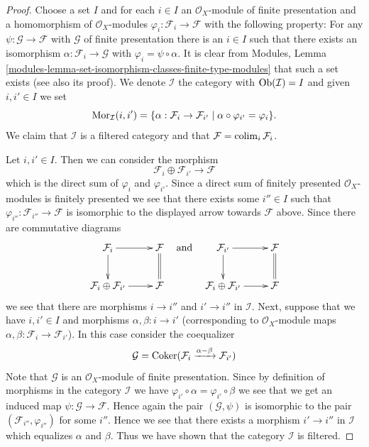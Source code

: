 \begin{proof}
Choose a set $I$ and for each $i \in I$ an $\mathcal{O}_X$-module
of finite presentation and a homomorphism of $\mathcal{O}_X$-modules
$\varphi_i : \mathcal{F}_i \to \mathcal{F}$ with the following
property: For any $\psi : \mathcal{G} \to \mathcal{F}$ with $\mathcal{G}$
of finite presentation there is an $i \in I$ such that there exists
an isomorphism $\alpha : \mathcal{F}_i \to \mathcal{G}$ with
$\varphi_i = \psi \circ \alpha$. It is clear from
Modules, Lemma \ref{modules-lemma-set-isomorphism-classes-finite-type-modules}
that such a set exists (see also its proof).
We denote $\mathcal{I}$ the category
with $\mathop{\mathrm{Ob}}\nolimits(\mathcal{I}) = I$ and given $i, i' \in I$
we set
$$
\mathop{\mathrm{Mor}}\nolimits_\mathcal{I}(i, i') =
\{\alpha : \mathcal{F}_i \to \mathcal{F}_{i'} \mid
\alpha \circ \varphi_{i'} = \varphi_i
\}.
$$
We claim that $\mathcal{I}$ is a filtered category and that
$\mathcal{F} = \mathop{\mathrm{colim}}\nolimits_i \mathcal{F}_i$.

\medskip\noindent
Let $i, i' \in I$. Then we can consider the morphism
$$
\mathcal{F}_i \oplus \mathcal{F}_{i'} \longrightarrow \mathcal{F}
$$
which is the direct sum of $\varphi_i$ and $\varphi_{i'}$.
Since a direct sum of finitely presented $\mathcal{O}_X$-modules
is finitely presented we see that there exists some $i'' \in I$
such that $\varphi_{i''} : \mathcal{F}_{i''} \to \mathcal{F}$
is isomorphic to the displayed arrow towards $\mathcal{F}$ above.
Since there are commutative diagrams
$$
\xymatrix{
\mathcal{F}_i \ar[r] \ar[d] & \mathcal{F} \ar@{=}[d] \\
\mathcal{F}_i \oplus \mathcal{F}_{i'} \ar[r] & \mathcal{F}
}
\quad
\text{and}
\quad
\xymatrix{
\mathcal{F}_{i'} \ar[r] \ar[d] & \mathcal{F} \ar@{=}[d] \\
\mathcal{F}_i \oplus \mathcal{F}_{i'} \ar[r] & \mathcal{F}
}
$$
we see that there are morphisms $i \to i''$ and $i' \to i''$
in $\mathcal{I}$. Next, suppose that we have $i, i' \in I$ and
morphisms $\alpha, \beta : i \to i'$ (corresponding to $\mathcal{O}_X$-module
maps $\alpha, \beta : \mathcal{F}_i \to \mathcal{F}_{i'}$).
In this case consider the coequalizer
$$
\mathcal{G} =
\mathop{\mathrm{Coker}}(
\mathcal{F}_i \xrightarrow{\alpha - \beta} \mathcal{F}_{i'}
)
$$
Note that $\mathcal{G}$ is an $\mathcal{O}_X$-module of finite presentation.
Since by definition of morphisms in the category $\mathcal{I}$
we have $\varphi_{i'} \circ \alpha = \varphi_{i'} \circ \beta$
we see that we get an induced map $\psi : \mathcal{G} \to \mathcal{F}$.
Hence again the pair $(\mathcal{G}, \psi)$ is isomorphic to
the pair $(\mathcal{F}_{i''}, \varphi_{i''})$ for some $i''$.
Hence we see that there exists a morphism $i' \to i''$ in
$\mathcal{I}$ which equalizes $\alpha$ and $\beta$. Thus we have
shown that the category $\mathcal{I}$ is filtered.


\end{proof}
